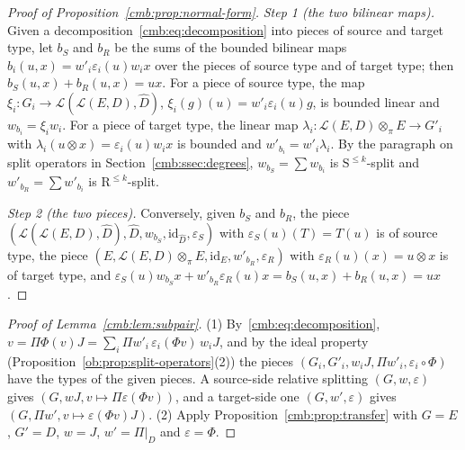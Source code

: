 \documentclass[11pt]{amsart}
\theoremstyle{definition}
\theoremstyle{remark}
\numberwithin{equation}{section}
\newcommand{\cL}{\mathcal L}
\newcommand{\id}{\mathrm{id}}
\theoremstyle{plain}
\theoremstyle{definition}
\theoremstyle{plain}
\begin{document}
\begin{proof}[Proof of Proposition~\ref{cmb:prop:normal-form}]
\emph{Step 1 (the two bilinear maps).} Given a decomposition~\eqref{cmb:eq:decomposition} into pieces of source and
target type, let $b_S$ and $b_R$ be the sums of the bounded bilinear maps $b_i(u,x)=w'_i\varepsilon_i(u)w_ix$ over the
pieces of source type and of target type; then $b_S(u,x)+b_R(u,x)=ux$. For a piece of source type, the map
$\xi_i\colon G_i\to\cL(\cL(E,D),\widehat D)$, $\xi_i(g)(u)=w'_i\varepsilon_i(u)g$, is bounded linear and
$w_{b_i}=\xi_iw_i$. For a piece of target type, the linear map $\lambda_i\colon\cL(E,D)\otimes_\pi E\to G'_i$ with
$\lambda_i(u\otimes x)=\varepsilon_i(u)w_ix$ is bounded and $w'_{b_i}=w'_i\lambda_i$. By the paragraph on split operators
in Section~\ref{cmb:ssec:degrees}, $w_{b_S}=\sum w_{b_i}$ is $\mathrm S^{\le k}$-split and $w'_{b_R}=\sum w'_{b_i}$ is
$\mathrm R^{\le k}$-split.

\emph{Step 2 (the two pieces).} Conversely, given $b_S$ and $b_R$, the piece
$(\cL(\cL(E,D),\widehat D),\widehat D,w_{b_S},\id_{\widehat D},\varepsilon_S)$ with $\varepsilon_S(u)(T)=T(u)$ is of
source type, the piece $(E,\cL(E,D)\otimes_\pi E,\id_E,w'_{b_R},\varepsilon_R)$ with $\varepsilon_R(u)(x)=u\otimes x$ is
of target type, and $\varepsilon_S(u)w_{b_S}x+w'_{b_R}\varepsilon_R(u)x=b_S(u,x)+b_R(u,x)=ux$.
\end{proof}

\begin{proof}[Proof of Lemma~\ref{cmb:lem:subpair}]
(1) By~\eqref{cmb:eq:decomposition}, $v=\Pi\Phi(v)J=\sum_i\Pi w'_i\,\varepsilon_i(\Phi v)\,w_iJ$, and by the ideal property
(Proposition~\ref{ob:prop:split-operators}(2)) the pieces $(G_i,G'_i,w_iJ,\Pi w'_i,\varepsilon_i\circ\Phi)$ have the types
of the given pieces. A source-side relative splitting $(G,w,\varepsilon)$ gives $(G,wJ,v\mapsto\Pi\varepsilon(\Phi v))$,
and a target-side one $(G,w',\varepsilon)$ gives $(G,\Pi w',v\mapsto\varepsilon(\Phi v)J)$. (2) Apply
Proposition~\ref{cmb:prop:transfer} with $G=E$, $G'=D$, $w=J$, $w'=\Pi|_D$ and $\varepsilon=\Phi$.
\end{proof}
\end{document}
